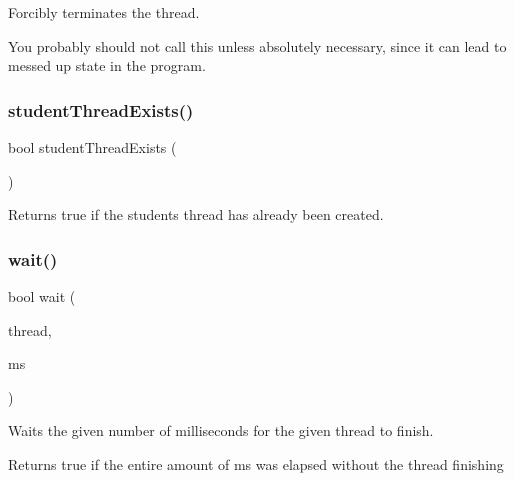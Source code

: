 Forcibly terminates the thread. 

You probably should not call this unless absolutely necessary, since it can lead to messed up state in the program. \mbox{\label{classGThread_af75b92d7df24cf0e2f06193944b9db32}} 
\subsubsection{\texorpdfstring{student\+Thread\+Exists()}{studentThreadExists()}}
{\footnotesize\ttfamily bool student\+Thread\+Exists (\begin{DoxyParamCaption}{ }\end{DoxyParamCaption})\hspace{0.3cm}{\ttfamily [static]}}



Returns true if the student\textquotesingle{}s thread has already been created. 

\mbox{\label{classGThread_a231df01e3224a1c4a109613a891f554e}} 
\subsubsection{\texorpdfstring{wait()}{wait()}}
{\footnotesize\ttfamily bool wait (\begin{DoxyParamCaption}\item[{\mbox{\hyperlink{classGThread}{G\+Thread}} $\ast$}]{thread,  }\item[{long}]{ms }\end{DoxyParamCaption})\hspace{0.3cm}{\ttfamily [static]}}



Waits the given number of milliseconds for the given thread to finish. 

\begin{DoxyReturn}{Returns}
true if the entire amount of ms was elapsed without the thread finishing 
\end{DoxyReturn}
\mbox{\label{classGThread_a77a5c1943920f355bd1db8cb99bddcfc}} 
